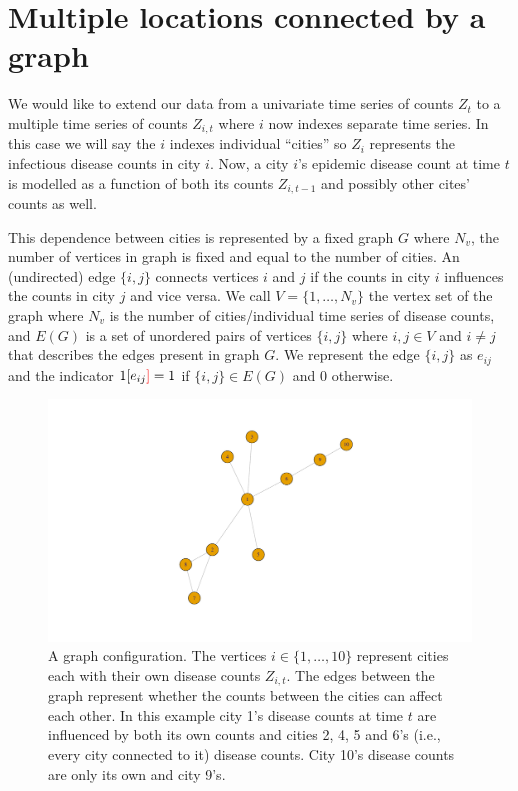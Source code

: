 \documentclass[11pt,a4paper]{article}
\numberwithin{equation}{section}
\begin{document}
\hypertarget{multiple-locations-connected-by-a-graph}{%
\section{Multiple locations connected by a
graph}\label{multiple-locations-connected-by-a-graph}}

We would like to extend our data from a univariate time series of counts
\(Z_t\) to a multiple time series of counts \(Z_{i,t}\) where \(i\) now
indexes separate time series. In this case we will say the \(i\) indexes
individual ``cities'' so \(Z_i\) represents the  infectious disease
counts in city \(i\). Now, a city \(i\)'s epidemic disease count at time
\(t\) is modelled as a function of both its counts \(Z_{i,t-1}\) and
possibly other cites' counts as well.

This dependence between cities is represented by a fixed graph \(G\)
where \(N_v\), the number of vertices in graph is fixed and equal to the
number of cities. An (undirected) edge \(\{i,j\}\) connects vertices
\(i\) and \(j\) if the counts in city \(i\) influences the counts in
city \(j\) and vice versa. We call \(V = \{1,\dots,N_v \}\) the vertex
set of the graph where \(N_v\) is the number of cities/individual time
series of disease counts, and \(E(G)\) is a set of unordered pairs of
vertices \(\{i,j\}\) where \(i,j \in V\) and \(i \neq j\) that describes
the edges present in graph \(G\). We represent the edge \(\{i,j\}\) as
\(e_{ij}\) and the indicator \(1[e_{ij}\dw{]}=1\del{]}\) if \(\{i,j\} \in E(G)\) and
0 otherwise.

\begin{figure}
\includegraphics[trim={1 2cm 0 2cm},clip]{thesis_draft_files/figure-latex/unnamed-chunk-1-1} \caption{\label{fig:graph example} A graph configuration. The vertices $i \in \{1,\dots, 10\}$ represent cities each with their own disease counts $Z_{i,t}$. The edges between the graph represent whether the counts between the cities can affect each other. In this example city 1's disease counts at time $t$ are influenced by both its own counts and cities 2, 4, 5 and 6's (i.e., every city connected to it) disease counts. City 10's disease counts are only its own and city 9's.}\label{fig:unnamed-chunk-1}
\end{figure}
\end{document}
